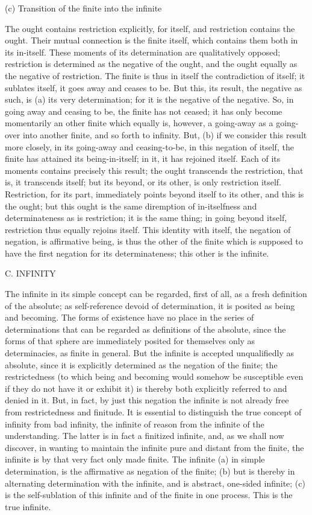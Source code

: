 (c) Transition of the finite into the infinite

The ought contains restriction explicitly, for itself,
and restriction contains the ought.
Their mutual connection is the finite itself,
which contains them both in its in-itself.
These moments of its determination are qualitatively opposed;
restriction is determined as the negative of the ought,
and the ought equally as the negative of restriction.
The finite is thus in itself the contradiction of itself;
it sublates itself, it goes away and ceases to be.
But this, its result, the negative as such,
is (a) its very determination;
for it is the negative of the negative.
So, in going away and ceasing to be,
the finite has not ceased;
it has only become momentarily
an other finite which equally is,
however, a going-away as a going-over
into another finite, and so forth to infinity.
But, (b) if we consider this result more closely,
in its going-away and ceasing-to-be,
in this negation of itself,
the finite has attained its being-in-itself;
in it, it has rejoined itself.
Each of its moments contains precisely this result;
the ought transcends the restriction,
that is, it transcends itself;
but its beyond, or its other, is only restriction itself.
Restriction, for its part, immediately points
beyond itself to its other,
and this is the ought;
but this ought is the same
diremption of in-itselfness and determinateness
as is restriction;
it is the same thing;
in going beyond itself,
restriction thus equally rejoins itself.
This identity with itself, the negation of negation,
is affirmative being, is thus the other of the finite
which is supposed to have the first negation
for its determinateness;
this other is the infinite.

C. INFINITY

The infinite in its simple concept
can be regarded, first of all,
as a fresh definition of the absolute;
as self-reference devoid of determination,
it is posited as being and becoming.
The forms of existence have no place in
the series of determinations that can be
regarded as definitions of the absolute,
since the forms of that sphere are
immediately posited for themselves
only as determinacies, as finite in general.
But the infinite is accepted
unqualifiedly as absolute,
since it is explicitly determined
as the negation of the finite;
the restrictedness
(to which being and becoming would somehow be susceptible
even if they do not have it or exhibit it)
is thereby both explicitly referred to and denied in it.
But, in fact, by just this negation the infinite is
not already free from restrictedness and finitude.
It is essential to distinguish
the true concept of infinity
from bad infinity,
the infinite of reason from
the infinite of the understanding.
The latter is in fact a finitized infinite,
and, as we shall now discover,
in wanting to maintain the infinite
pure and distant from the finite,
the infinite is by that very fact
only made finite.
The infinite
(a) in simple determination,
is the affirmative as negation of the finite;
(b) but is thereby in alternating
determination with the infinite,
and is abstract, one-sided infinite;
(c) is the self-sublation of this infinite
and of the finite in one process.
This is the true infinite.

